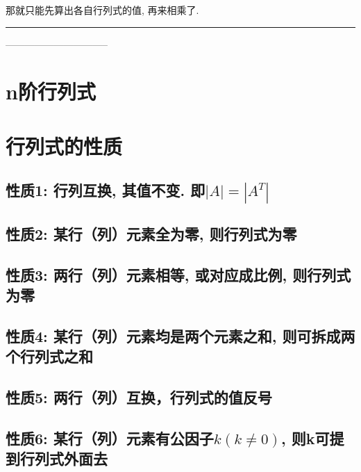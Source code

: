 \documentclass[UTF8]{ctexart}
\begin{document}
那就只能先算出各自行列式的值, 再来相乘了.
	
	
	\hrule
	

	
	
	
	
	
	\begin{myEnvSample}

	\end{myEnvSample}
	
	
	
	
	--------------------------------
	
	\section{n阶行列式}
	
	
	\section{行列式的性质}
	
	\subsection{性质1: 行列互换, 其值不变. 即$|A|=\left| A^T \right|$}
	
	\subsection{性质2: 某行（列）元素全为零, 则行列式为零}
	
	\subsection{性质3: 两行（列）元素相等, 或对应成比例, 则行列式为零}
	
	\subsection{性质4: 某行（列）元素均是两个元素之和, 则可拆成两个行列式之和}
	
	\subsection{性质5: 两行（列）互换，行列式的值反号}
	
	\subsection{性质6: 某行（列）元素有公因子$k\left( k\ne 0 \right) $, 则k可提到行列式外面去 }
	
\end{document}

